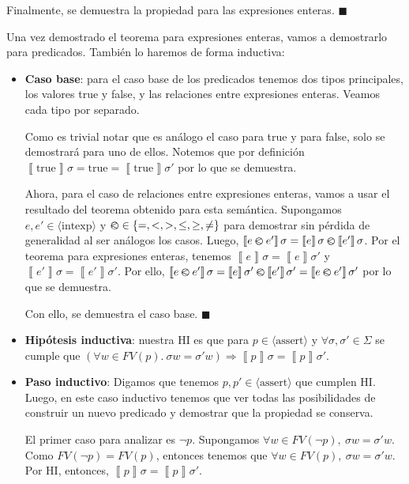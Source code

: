 \documentclass{article}
\newcommand{\aexp}[1]{\langle\text{#1}\rangle}
\newcommand{\intexp}{\aexp{intexp}}
\newcommand{\assert}{\aexp{assert}}
\newcommand{\sem}[1]{\left\llbracket #1\right\rrbracket}
\begin{document}
Finalmente, se demuestra la propiedad para las expresiones enteras. $\blacksquare$

Una vez demostrado el teorema para expresiones enteras, vamos a demostrarlo para predicados.
También lo haremos de forma inductiva:
\begin{itemize}
	\item \textbf{Caso base}: para el caso base de los predicados tenemos dos tipos principales, los valores true y false, y las relaciones entre expresiones enteras.
	      Veamos cada tipo por separado.

	      Como es trivial notar que es análogo el caso para true y para false, solo se demostrará para uno de ellos.
	      Notemos que por definición $\sem{\text{true}} \sigma = \text{true} = \sem{\text{true}} \sigma'$ por lo que se demuestra.

	      Ahora, para el caso de relaciones entre expresiones enteras, vamos a usar el resultado del teorema obtenido para esta semántica.
	      Supongamos $e, e' \in \intexp$ y $\varolessthan \in \{ = , < , > , \leq , \geq , \neq\}$ para demostrar sin pérdida de generalidad al ser análogos los casos.
	      Luego, $\sem{e \varolessthan e'} \sigma = \sem{e} \sigma \varolessthan \sem{e'} \sigma$.
	      Por el teorema para expresiones enteras, tenemos $\sem{e} \sigma = \sem{e} \sigma'$ y $\sem{e'} \sigma = \sem{e'} \sigma'$.
	      Por ello, $\sem{e \varolessthan e'} \sigma = \sem{e} \sigma' \varolessthan \sem{e'} \sigma' = \sem{e \varolessthan e'} \sigma'$ por lo que se demuestra.

	      Con ello, se demuestra el caso base. $\blacksquare$

	\item \textbf{Hipótesis inductiva}: nuestra HI es que para $p \in \assert$ y $\forall \sigma, \sigma' \in \Sigma$ se cumple que $(\forall w \in FV(p).\ \sigma w = \sigma' w) \Rightarrow \sem{p} \sigma = \sem{p} \sigma'$.
	\item \textbf{Paso inductivo}: Digamos que tenemos $p, p' \in \assert$ que cumplen HI. Luego, en este caso inductivo tenemos que ver todas las posibilidades de construir un nuevo predicado y demostrar que la propiedad se conserva.

	      El primer caso para analizar es $\neg p$.
	      Supongamos $\forall w \in FV(\neg p),\ \sigma w = \sigma' w$.
	      Como $FV(\neg p) = FV(p)$, entonces tenemos que $\forall w \in FV(p),\ \sigma w = \sigma' w$.
	      Por HI, entonces, $\sem{p} \sigma = \sem{p} \sigma'$.


\end{itemize}
\end{document}
